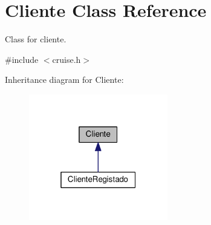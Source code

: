 \hypertarget{classCliente}{}\section{Cliente Class Reference}
\label{classCliente}


Class for cliente.  




{\ttfamily \#include $<$cruise.\+h$>$}



Inheritance diagram for Cliente\+:\nopagebreak
\begin{figure}[H]
\begin{center}
\leavevmode
\includegraphics[width=172pt]{classCliente__inherit__graph}
\end{center}
\end{figure}
